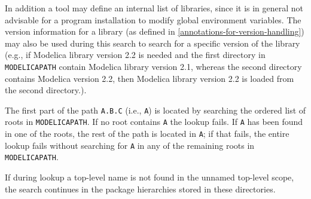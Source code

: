 In addition a tool may define an internal list of libraries, since it is in general not advisable for a program installation to modify global environment variables.
The version information for a library (as defined in \cref{annotations-for-version-handling}) may also be used during this search to search for a specific version of the library (e.g., if Modelica library version 2.2 is needed and the first directory in \lstinline!MODELICAPATH! contain Modelica library version 2.1, whereas the second directory contains Modelica version 2.2, then Modelica library version 2.2 is loaded from the second directory.).

\begin{nonnormative}
The first part of the path \lstinline!A.B.C! (i.e., \lstinline!A!) is located by searching the ordered list of roots in \lstinline!MODELICAPATH!.
If no root contains \lstinline!A! the lookup fails.
If \lstinline!A! has been found in one of the roots, the rest of the path is located in \lstinline!A!; if that fails, the entire lookup fails without searching for \lstinline!A! in any of the remaining roots in \lstinline!MODELICAPATH!.
\end{nonnormative}

If during lookup a top-level name is not found in the unnamed top-level scope, the search continues in the package hierarchies stored in these directories.

